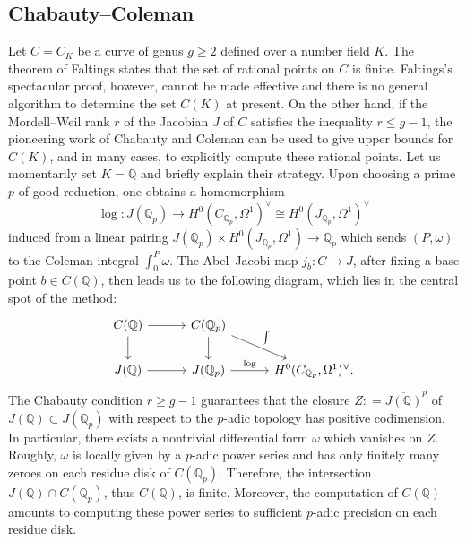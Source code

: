 \documentclass[11pt,oneside]{amsart}
\theoremstyle{plain}
\theoremstyle{definition}
\def\lra{{\longrightarrow}}
\def\Q{\mathbb{Q}}
\def\ra{\rightarrow}
\begin{document}
\subsection{Chabauty--Coleman}\label{ss:CC_method}
Let $C = C_K$ be a curve of genus $g \ge 2$ defined over a number field $K$. The theorem of Faltings states that the set of rational points on $C$ is finite. Faltings's spectacular proof, however, cannot be made effective and there is no general algorithm to determine the set $C(K)$ at present. On the other hand, if the Mordell--Weil rank $r$ of the Jacobian $J$  of $C$ satisfies the inequality  
$r \le g -1$,  the pioneering work of Chabauty and Coleman  \cite{chab41, coleman}  can be used to give upper bounds for $C(K)$, and in many cases, to explicitly compute these rational points. 
Let us momentarily set $K = \Q$ and briefly explain their strategy. Upon choosing a prime $p$ of good reduction, one obtains a homomorphism 
$$\log: J (\Q_p) \lra H^0 (C_{\Q_p}, \Omega^1)^{\vee} \cong H^0 (J_{\Q_p}, \Omega^1)^{\vee} $$
induced from a linear pairing 
$J(\Q_p) \times H^0 (J_{\Q_p}, \Omega^1) \longrightarrow \Q_p$ which sends $(P, \omega)$ to the Coleman integral $\int_{0}^P \omega$. The Abel--Jacobi map $j_b: C \ra J$, after fixing a base point $b \in C(\Q)$, then leads us to the following diagram, which lies in the central spot of the method: 
\[
\begin{tikzcd}[column sep = 3em] 
C(\Q) \arrow[r] \arrow[d] & C(\Q_p)  \arrow[d] \arrow[rd, "\int"] \\
J(\Q) \arrow[r] & J (\Q_p)   \arrow[r, "\log"] & H^0 (C_{\Q_p}, \Omega^1)^{\vee}.
\end{tikzcd}
\]
The Chabauty condition $r \ge g - 1$ guarantees that the closure $Z : = \overline{J(\Q)}^p$ of $J(\Q) \subset J (\Q_p)$ with respect to the $p$-adic topology has positive codimension. In particular, there exists a nontrivial differential form $\omega$ which vanishes on $Z$. Roughly, $\omega$ is locally given by a $p$-adic power series and has only finitely many zeroes on each residue disk of $C(\Q_p)$. Therefore, the intersection $J(\Q) \cap C(\Q_p)$, thus $C(\Q)$, is finite. Moreover, the computation of $C(\Q)$ amounts to computing these power series to sufficient $p$-adic precision on each residue disk.  
\end{document}
